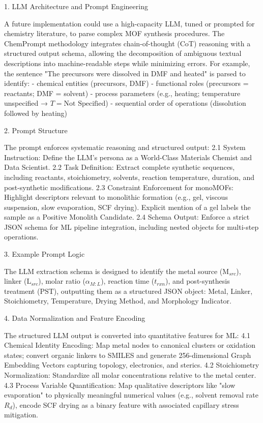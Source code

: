 \documentclass[12pt,a4paper]{article}
\begin{document}
1. LLM Architecture and Prompt Engineering  

   A future implementation could use a high-capacity LLM, tuned or prompted for chemistry literature, to parse complex MOF synthesis procedures. The ChemPrompt methodology integrates chain-of-thought (CoT) reasoning with a structured output schema, allowing the decomposition of ambiguous textual descriptions into machine-readable steps while minimizing errors. For example, the sentence "The precursors were dissolved in DMF and heated" is parsed to identify:  
   - chemical entities (precursors, DMF)  
   - functional roles (precursors = reactants; DMF = solvent)  
   - process parameters (e.g., heating; temperature unspecified → $T = \text{Not Specified}$)  
   - sequential order of operations (dissolution followed by heating)  

2. Prompt Structure  

   The prompt enforces systematic reasoning and structured output:  
   2.1 System Instruction: Define the LLM’s persona as a World-Class Materials Chemist and Data Scientist.  
   2.2 Task Definition: Extract complete synthetic sequences, including reactants, stoichiometry, solvents, reaction temperature, duration, and post-synthetic modifications.  
   2.3 Constraint Enforcement for monoMOFs: Highlight descriptors relevant to monolithic formation (e.g., gel, viscous suspension, slow evaporation, SCF drying). Explicit mention of a gel labels the sample as a Positive Monolith Candidate.  
   2.4 Schema Output: Enforce a strict JSON schema for ML pipeline integration, including nested objects for multi-step operations.

3. Example Prompt Logic  

   The LLM extraction schema is designed to identify the metal source ($\text{M}_{src}$), linker ($\text{L}_{src}$), molar ratio ($\alpha_{M:L}$), reaction time ($t_{rxn}$), and post-synthesis treatment ($\text{PST}$), outputting them as a structured JSON object: Metal, Linker, Stoichiometry, Temperature, Drying Method, and Morphology Indicator.

4. Data Normalization and Feature Encoding  

   The structured LLM output is converted into quantitative features for ML:  
   4.1 Chemical Identity Encoding: Map metal nodes to canonical clusters or oxidation states; convert organic linkers to SMILES and generate 256-dimensional Graph Embedding Vectors capturing topology, electronics, and sterics.  
   4.2 Stoichiometry Normalization: Standardize all molar concentrations relative to the metal center.  
   4.3 Process Variable Quantification: Map qualitative descriptors like "slow evaporation" to physically meaningful numerical values (e.g., solvent removal rate $R_d$), encode SCF drying as a binary feature with associated capillary stress mitigation.
\end{document}
